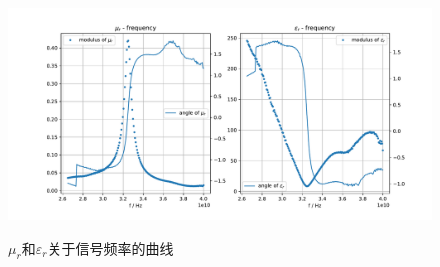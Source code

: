 \documentclass[a4paper]{article}
\begin{document}
\begin{figure}[!h]
\centering
\includegraphics[width=12cm]{fig/final.pdf}\\
\caption{$\mu_r$和$\varepsilon_r$关于信号频率的曲线}\label{final}
\end{figure}
\end{document}
